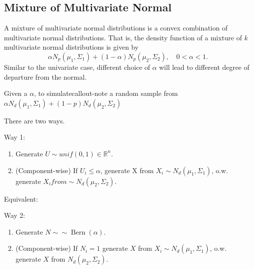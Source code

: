 \documentclass[
  letterpaper,
  DIV=11,
  numbers=noendperiod]{scrreprt}
\begin{document}
\subsection{Mixture of Multivariate
Normal}\label{mixture-of-multivariate-normal}

A mixture of multivariate normal distributions is a convex combination
of multivariate normal distributions. That is, the density function of a
mixture of \(k\) multivariate normal distributions is given by \[
\alpha N_p(\mu_1,\Sigma_1) + (1-\alpha) N_p(\mu_2,\Sigma_2), \quad 0 < \alpha < 1.
\] Similar to the univariate case, different choice of \(\alpha\) will
lead to different degree of departure from the normal.

Given a \(\alpha\), to simulatecallout-note a random sample from
\(\alpha N_d(\mu_1, \Sigma_1) + (1 − p) N_d(\mu_2, \Sigma_2)\)

There are two ways.

Way 1:

\begin{enumerate}
\def\labelenumi{\arabic{enumi}.}
\item
  Generate \(U \sim unif(0,1) \in \mathbb{R}^n\).
\item
  (Component-wise) If \(U_i \le \alpha\), generate X from
  \(X_i\sim N_d(\mu_1, \Sigma_1)\), o.w. generate
  \(X_i from \sim N_d(\mu_2, \Sigma_2)\).
\end{enumerate}

Equivalent:

Way 2:

\begin{enumerate}
\def\labelenumi{\arabic{enumi}.}
\item
  Generate \(N \sim ∼ \operatorname{Bern}(\alpha)\).
\item
  (Component-wise) If \(N_i = 1\) generate \(X\) from
  \(X_i \sim N_d(\mu_1, \Sigma_1)\), o.w. generate \(X\) from
  \(N_d(\mu_2, \Sigma_2)\).
\end{enumerate}
\end{document}
